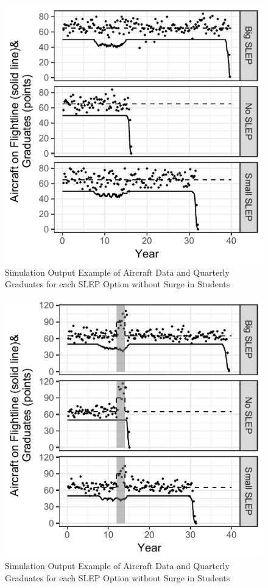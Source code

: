 \documentclass[preprint,12pt]{elsarticle}
\begin{document}
\begin{figure}[h]
  \centering\includegraphics{time_series_fleet_no_surge}
  \caption{Simulation Output Example of Aircraft Data and Quarterly
    Graduates for each SLEP Option without Surge in Students}
  \label{f:ts_no_surge}
\end{figure}

\begin{figure}[h]
  \centering\includegraphics{time_series_fleet_surge}
  \caption{Simulation Output Example of Aircraft Data and Quarterly
    Graduates for each SLEP Option without Surge in Students}
  \label{f:ts_surge}
\end{figure}
\end{document}
